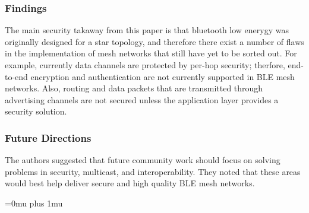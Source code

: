 \subsubsection{Findings}

\noindent
The main security takaway from this paper is that bluetooth low enerygy was originally designed for a star topology, and therefore there exist a number of flaws in the implementation of mesh networks that still have yet to be sorted out. For example, currently data channels are protected by per-hop security; therfore, end-to-end encryption and authentication are not currently supported in BLE mesh networks. Also, routing and data packets that are transmitted through advertising channels are not secured unless the application layer provides a security solution.

\subsubsection{Future Directions}

\noindent
The authors suggested that future community work should focus on solving problems in security, multicast, and interoperability. They noted that these areas would best help deliver secure and high quality BLE mesh networks.

\Urlmuskip=0mu plus 1mu\relax
\pagebreak